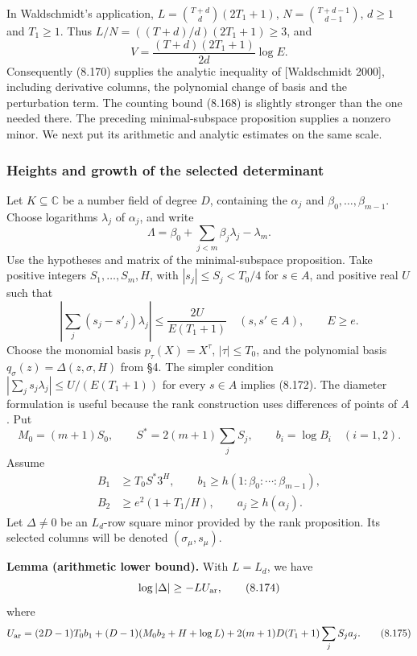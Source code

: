 \documentclass[
  11pt,
  a4paper,
]{article}
\begin{document}
In Waldschmidt's application, \(L=\binom{T+d}{d}(2T_1+1)\),
\(N=\binom{T+d-1}{d-1}\), \(d\ge1\) and \(T_1\ge1\). Thus
\(L/N=((T+d)/d)(2T_1+1)\ge3\), and \[
V=\frac{(T+d)(2T_1+1)}{2d}\log E.
\] Consequently (8.170) supplies the analytic inequality of
{[}Waldschmidt 2000{]}, including derivative columns, the polynomial
change of basis and the perturbation term. The counting bound (8.168) is
slightly stronger than the one needed there. The preceding
minimal-subspace proposition supplies a nonzero minor. We next put its
arithmetic and analytic estimates on the same scale.

\subsubsection{Heights and growth of the selected
determinant}\label{heights-and-growth-of-the-selected-determinant}

Let \(K\subseteq\mathbb C\) be a number field of degree \(D\),
containing the \(\alpha_j\) and \(\beta_0,\ldots,\beta_{m-1}\). Choose
logarithms \(\lambda_j\) of \(\alpha_j\), and write \[
\Lambda=\beta_0+\sum_{j<m}\beta_j\lambda_j-\lambda_m.
\] Use the hypotheses and matrix of the minimal-subspace proposition.
Take positive integers \(S_1,\ldots,S_m,H\), with \(|s_j|\le S_j<T_0/4\)
for \(s\in A\), and positive real \(U\) such that \[
\left|\sum_j(s_j-s'_j)\lambda_j\right|
\le\frac{2U}{E(T_1+1)}
\quad(s,s'\in A),\qquad E\ge e.
\tag{8.172}
\] Choose the monomial basis \(p_\tau(X)=X^\tau\), \(|\tau|\le T_0\),
and the polynomial basis \(q_\sigma(z)=\Delta(z,\sigma,H)\) from §4. The
simpler condition \(\left|\sum_js_j\lambda_j\right|\le U/(E(T_1+1))\)
for every \(s\in A\) implies (8.172). The diameter formulation is useful
because the rank construction uses differences of points of \(A\). Put
\[
M_0=(m+1)S_0,\qquad
S^*=2(m+1)\sum_jS_j,\qquad
b_i=\log B_i\quad(i=1,2).
\] Assume \[
\begin{split}
B_1&\ge T_0S^*3^H,\qquad
b_1\ge h(1:\beta_0:\cdots:\beta_{m-1}),\\
B_2&\ge e^2(1+T_1/H),\qquad
a_j\ge h(\alpha_j).
\end{split}
\tag{8.173}
\] Let \(\Delta\ne0\) be an \(L_d\)-row square minor provided by the
rank proposition. Its selected columns will be denoted
\((\sigma_\mu,s_\mu)\).

\textbf{Lemma (arithmetic lower bound).} With \(L=L_d\), we have \[
\log|\Delta|\ge-LU_{\rm ar},
\tag{8.174}
\] where \[
U_{\rm ar}=
(2D-1)T_0b_1+(D-1)(M_0b_2+H+\log L)
+2(m+1)D(T_1+1)\sum_jS_ja_j.
\tag{8.175}
\]
\end{document}
